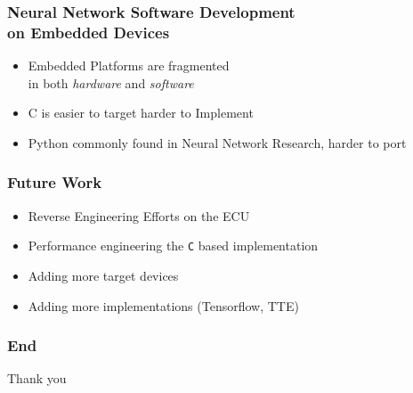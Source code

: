 \documentclass{beamer}
\begin{document}
\begin{frame}
  \frametitle{Neural Network Software Development \\ on Embedded Devices}

  \begin{itemize}
    \item Embedded Platforms are fragmented \\ in both \textit{hardware} and \textit{software}
    \item C is easier to target harder to Implement
    \item Python commonly found in Neural Network Research, harder to port
  \end{itemize}

\end{frame}

\begin{frame}
  \frametitle{Future Work}

  \begin{itemize}
    \item Reverse Engineering Efforts on the ECU
    \item Performance engineering the \texttt{C} based implementation
    \item Adding more target devices
    \item Adding more implementations (Tensorflow, TTE)
  \end{itemize}

\end{frame}


\begin{frame}
  \frametitle{End}

  \centerline{{\Large Thank you}}

\end{frame}
\end{document}
